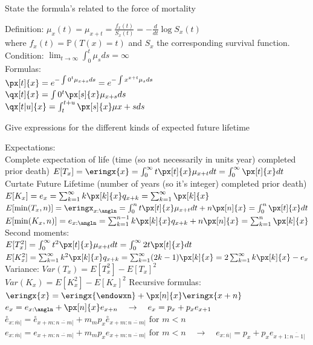 \documentclass[11pt,a4paper,twoside]{article}
\begin{document}
State the formula's related to the force of mortality

Definition: $ \mu_x(t) = \mu_{x+t} = \frac{f_x(t)}{S_x(t)} = - \frac{d}{dt}\log S_x(t) $ \\
where $ f_x(t) = \mathbb{P}(T(x) = t) $ and $ S_x $ the corresponding survival function.
Condition: $ \lim_{t \to \infty} \int_{0}^t \mu_s ds = \infty $ \\
Formulas: \\
$ \px[t]{x} = e^{-\int{0}^t \mu_{x+s}ds} = e^{-\int{x}^{x+t} \mu_s ds} $ \\
$ \qx[t]{x} = \int{0}^t \px[s]{x} \mu_{x+s}ds $ \\
$ \qx[t|u]{x} = \int_{t}^{t+u} \px[s]{x}\mu{x+s} ds $


Give expressions for the different kinds of expected future lifetime

Expectations: \\
Complete expectation of life (time (so not necessarily in units year) completed prior death)
$E[T_x] = \eringx{x} = \int_0^\infty t \px[t]{x} \mu_{x+t} dt = \int_0^\infty \px[t]{x} dt$ \\
Curtate Future Lifetime (number of years (so it's integer) completed prior death)
$E[K_x] = e_x = \sum_{k=1}^\infty k \px[k]{x} q_{x+k} = \sum_{k=1}^\infty \px[k]{x}$ \\
$E[\min(T_x, n)] = \eringx_{x:\angln} = \int_0^n t \px[t]{x} \mu_{x+t} dt + n \px[n]{x} = \int_0^n \px[t]{x} dt$ \\
$E[\min(K_x, n)] = e_{x:\angln} = \sum_{k=1}^{n-1} k \px[k]{x} q_{x+k} + n \px[n]{x} = \sum_{k=1}^n \px[k]{x}$ \\
\newline
Second moments: \\
$E[T_x^2] = \int_0^\infty t^2 \px[t]{x} \mu_{x+t} dt = \int_0^\infty 2t \px[t]{x} dt$ \\
$E[K_x^2] = \sum_{k=1}^\infty k^2 \px[k]{x} q_{x+k} = \sum_{k=1}^\infty (2k-1) \px[k]{x} = 2 \sum_{k=1}^\infty k \px[k]{x} - e_x$
\newline
Variance:
$Var(T_x) = E[T_x^2] - E[T_x]^2$ \\
$Var(K_x) = E[K_x^2] - E[K_x]^2$
\newline
Recursive formulas: \\
$\eringx{x}= \eringx{\endowxn} + \px[n]{x} \eringx{x+n}$ \\
$e_x = e_{x:\angln} + \px[n]{x} e_{x+n} \quad \rightarrow \quad e_x = p_x + p_x e_{x+1}$ \\
$\overset{\circ}{e}_{x:\overline{m}|} = \overset{\circ}{e}_{x+m:\overline{n-m}|} + m {}_m p_x \overset{\circ}{e}_{x+m:\overline{n-m}|} \text{ for } m < n$ \\
$e_{x:\overline{m}|} = e_{x+m:\overline{n-m}|} + m {}_m p_x e_{x+m:\overline{n-m}|} \text{ for } m < n \quad \rightarrow \quad e_{x:\overline{n}|} = p_x + p_x e_{x+1:\overline{n-1}|}$
\end{document}
